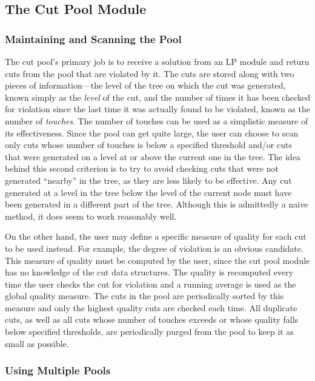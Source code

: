 \subsection{The Cut Pool Module}

\subsubsection{Maintaining and Scanning the Pool}

The cut pool's primary job is to receive a solution from an
LP module and return cuts from the pool that are violated by it. The
cuts are stored along with two pieces of information---the level of
the tree on which the cut was generated, known simply as the {\em
level} of the cut, and the number of times it has been checked for
violation since the last time it was actually found to be violated,
known as the number of {\em touches}. The number of touches
can be used as a simplistic measure of its effectiveness. Since the pool
can get quite large, the user can choose to scan only cuts whose
number of touches is below a specified threshold and/or cuts that were
generated on a level at or above the current one in the tree. The idea
behind this second criterion is to try to avoid checking cuts that were
not generated ``nearby'' in the tree, as they are less likely to be
effective. Any cut generated at a level in the tree
below the level of the current node must have been generated in a
different part of the tree. Although this is admittedly a naive
method, it does seem to work reasonably well.

On the other hand, the user may define a specific measure of quality for
each cut to be used instead. For example, the degree of
violation is an obvious candidate. This measure of quality must be
computed by the user, since the cut pool module has no knowledge of
the cut data structures. The quality is recomputed every time
the user checks the cut for violation and a running average is used as
the global quality measure. The cuts in the pool are periodically
sorted by this measure and only the highest quality cuts
are checked each time. All duplicate cuts, as well as all cuts whose
number of touches exceeds or whose quality falls below specified
thresholds, are periodically purged from the pool to keep it as small as
possible.

\subsubsection{Using Multiple Pools}
\label{multi-cut-pools}

